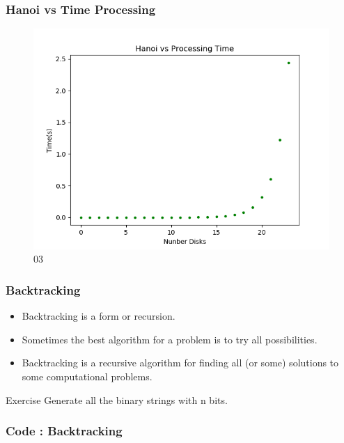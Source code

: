 \documentclass{beamer}
\begin{document}
\begin{frame}
\frametitle{Hanoi vs Time Processing}
\begin{figure}
\includegraphics[scale=0.5]{img/ch01_hanoi_time.png}
\caption{03}
\end{figure}
\end{frame}



\begin{frame}
\frametitle{Backtracking}
\begin{itemize}
\item Backtracking is a form or recursion.
\item Sometimes the best algorithm for a problem is to try all possibilities.
\item Backtracking is a recursive algorithm for finding all (or some) solutions to some computational problems.
\end{itemize}

\begin{block}{Exercise}
Generate all the binary strings with n bits.
\end{block}

\end{frame}


\begin{frame}
\frametitle{Code : Backtracking}

\end{frame}
\end{document}
